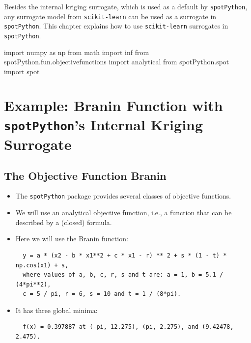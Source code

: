 \documentclass[
  letterpaper,
  DIV=11,
  numbers=noendperiod]{scrreprt}
\newenvironment{Shaded}{\begin{snugshade}}{\end{snugshade}}
\newcommand{\ImportTok}[1]{\textcolor[rgb]{0.00,0.46,0.62}{#1}}
\newcommand{\NormalTok}[1]{\textcolor[rgb]{0.00,0.23,0.31}{#1}}
\begin{document}
Besides the internal kriging surrogate, which is used as a default by
\texttt{spotPython}, any surrogate model from \texttt{scikit-learn} can
be used as a surrogate in \texttt{spotPython}. This chapter explains how
to use \texttt{scikit-learn} surrogates in \texttt{spotPython}.

\begin{Shaded}
\begin{Highlighting}[]
\ImportTok{import}\NormalTok{ numpy }\ImportTok{as}\NormalTok{ np}
\ImportTok{from}\NormalTok{ math }\ImportTok{import}\NormalTok{ inf}
\ImportTok{from}\NormalTok{ spotPython.fun.objectivefunctions }\ImportTok{import}\NormalTok{ analytical}
\ImportTok{from}\NormalTok{ spotPython.spot }\ImportTok{import}\NormalTok{ spot}
\end{Highlighting}
\end{Shaded}

\hypertarget{example-branin-function-with-spotpythons-internal-kriging-surrogate}{%
\section{\texorpdfstring{Example: Branin Function with
\texttt{spotPython}'s Internal Kriging
Surrogate}{Example: Branin Function with spotPython's Internal Kriging Surrogate}}\label{example-branin-function-with-spotpythons-internal-kriging-surrogate}}

\hypertarget{the-objective-function-branin-1}{%
\subsection{The Objective Function
Branin}\label{the-objective-function-branin-1}}

\begin{itemize}
\item
  The \texttt{spotPython} package provides several classes of objective
  functions.
\item
  We will use an analytical objective function, i.e., a function that
  can be described by a (closed) formula.
\item
  Here we will use the Branin function:

\begin{verbatim}
  y = a * (x2 - b * x1**2 + c * x1 - r) ** 2 + s * (1 - t) * np.cos(x1) + s,
  where values of a, b, c, r, s and t are: a = 1, b = 5.1 / (4*pi**2),
  c = 5 / pi, r = 6, s = 10 and t = 1 / (8*pi).
\end{verbatim}
\item
  It has three global minima:

\begin{verbatim}
  f(x) = 0.397887 at (-pi, 12.275), (pi, 2.275), and (9.42478, 2.475).
\end{verbatim}
\end{itemize}
\end{document}
